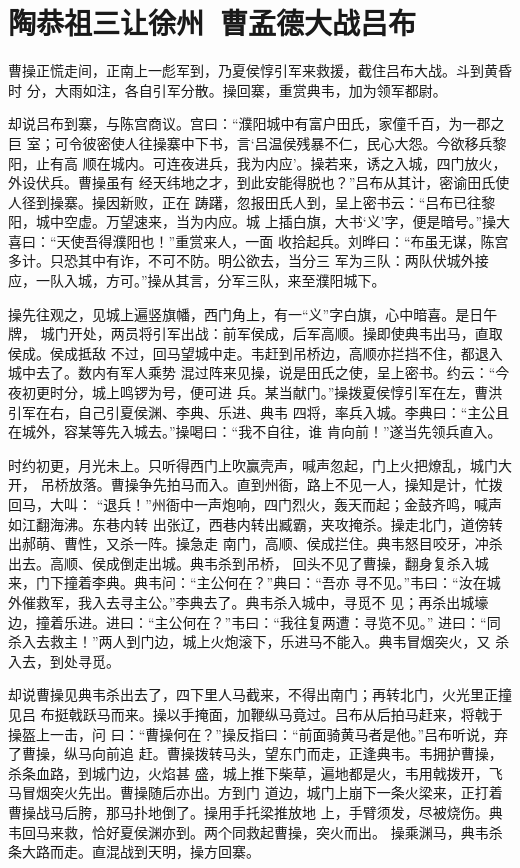 \chapter{陶恭祖三让徐州~曹孟德大战吕布}


曹操正慌走间，正南上一彪军到，乃夏侯惇引军来救援，截住吕布大战。斗到黄昏时
分，大雨如注，各自引军分散。操回寨，重赏典韦，加为领军都尉。

却说吕布到寨，与陈宫商议。宫曰：“濮阳城中有富户田氏，家僮千百，为一郡之巨
室；可令彼密使人往操寨中下书，言‘吕温侯残暴不仁，民心大怨。今欲移兵黎阳，止有高
顺在城内。可连夜进兵，我为内应’。操若来，诱之入城，四门放火，外设伏兵。曹操虽有
经天纬地之才，到此安能得脱也？”吕布从其计，密谕田氏使人径到操寨。操因新败，正在
踌躇，忽报田氏人到，呈上密书云：“吕布已往黎阳，城中空虚。万望速来，当为内应。城
上插白旗，大书‘义’字，便是暗号。”操大喜曰：“天使吾得濮阳也！”重赏来人，一面
收拾起兵。刘晔曰：“布虽无谋，陈宫多计。只恐其中有诈，不可不防。明公欲去，当分三
军为三队：两队伏城外接应，一队入城，方可。”操从其言，分军三队，来至濮阳城下。

操先往观之，见城上遍竖旗幡，西门角上，有一“义”字白旗，心中暗喜。是日午牌，
城门开处，两员将引军出战：前军侯成，后军高顺。操即使典韦出马，直取侯成。侯成抵敌
不过，回马望城中走。韦赶到吊桥边，高顺亦拦挡不住，都退入城中去了。数内有军人乘势
混过阵来见操，说是田氏之使，呈上密书。约云：“今夜初更时分，城上鸣锣为号，便可进
兵。某当献门。”操拨夏侯惇引军在左，曹洪引军在右，自己引夏侯渊、李典、乐进、典韦
四将，率兵入城。李典曰：“主公且在城外，容某等先入城去。”操喝曰：“我不自往，谁
肯向前！”遂当先领兵直入。

时约初更，月光未上。只听得西门上吹赢壳声，喊声忽起，门上火把燎乱，城门大开，
吊桥放落。曹操争先拍马而入。直到州衙，路上不见一人，操知是计，忙拨回马，大叫：
“退兵！”州衙中一声炮响，四门烈火，轰天而起；金鼓齐鸣，喊声如江翻海沸。东巷内转
出张辽，西巷内转出臧霸，夹攻掩杀。操走北门，道傍转出郝萌、曹性，又杀一阵。操急走
南门，高顺、侯成拦住。典韦怒目咬牙，冲杀出去。高顺、侯成倒走出城。典韦杀到吊桥，
回头不见了曹操，翻身复杀入城来，门下撞着李典。典韦问：“主公何在？”典曰：“吾亦
寻不见。”韦曰：“汝在城外催救军，我入去寻主公。”李典去了。典韦杀入城中，寻觅不
见；再杀出城壕边，撞着乐进。进曰：“主公何在？”韦曰：“我往复两遭：寻览不见。”
进曰：“同杀入去救主！”两人到门边，城上火炮滚下，乐进马不能入。典韦冒烟突火，又
杀入去，到处寻觅。

却说曹操见典韦杀出去了，四下里人马截来，不得出南门；再转北门，火光里正撞见吕
布挺戟跃马而来。操以手掩面，加鞭纵马竟过。吕布从后拍马赶来，将戟于操盔上一击，问
曰：“曹操何在？”操反指曰：“前面骑黄马者是他。”吕布听说，弃了曹操，纵马向前追
赶。曹操拨转马头，望东门而走，正逢典韦。韦拥护曹操，杀条血路，到城门边，火焰甚
盛，城上推下柴草，遍地都是火，韦用戟拨开，飞马冒烟突火先出。曹操随后亦出。方到门
道边，城门上崩下一条火梁来，正打着曹操战马后胯，那马扑地倒了。操用手托梁推放地
上，手臂须发，尽被烧伤。典韦回马来救，恰好夏侯渊亦到。两个同救起曹操，突火而出。
操乘渊马，典韦杀条大路而走。直混战到天明，操方回寨。


